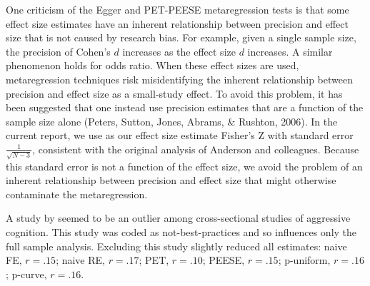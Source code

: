 One criticism of the Egger and PET-PEESE metaregression tests is that some effect size estimates have an inherent relationship between precision and effect size that is not caused by research bias. For example, given a single sample size, the precision of Cohen's $d$ increases as the effect size $d$ increases. A similar phenomenon holds for odds ratio. When these effect sizes are used, metaregression techniques risk misidentifying the inherent relationship between precision and effect size as a small-study effect. To avoid this problem, it has been suggested that one instead use precision estimates that are a function of the sample size alone (Peters, Sutton, Jones, Abrams, \& Rushton, 2006). In the current report, we use as our effect size estimate Fisher's Z with standard error $\frac{1}{\sqrt{N-3}}$, consistent with the original analysis of Anderson and colleagues. Because this standard error is not a function of the effect size, we avoid the problem of an inherent relationship between precision and effect size that might otherwise contaminate the metaregression.

A study by \citet{Sigurdsson:etal:2006} seemed to be an outlier among cross-sectional studies of aggressive cognition. This study was coded as not-best-practices and so influences only the full sample analysis. Excluding this study slightly reduced all estimates:  naive FE, $r = .15$; naive RE, $r = .17$; PET, $r = .10$; PEESE, $r = .15$; p-uniform, $r = .16$; p-curve, $r = .16$.